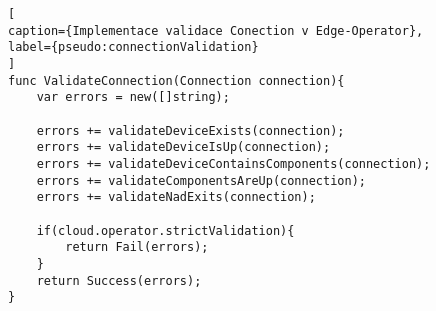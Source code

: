 \begin{lstfloat}
\begin{lstlisting}[
caption={Implementace validace Conection v Edge-Operator},
label={pseudo:connectionValidation}
]
func ValidateConnection(Connection connection){
    var errors = new([]string);

    errors += validateDeviceExists(connection);
    errors += validateDeviceIsUp(connection);
    errors += validateDeviceContainsComponents(connection);
    errors += validateComponentsAreUp(connection);
    errors += validateNadExits(connection);

    if(cloud.operator.strictValidation){
        return Fail(errors);
    }
    return Success(errors);
}
\end{lstlisting}
\end{lstfloat}
